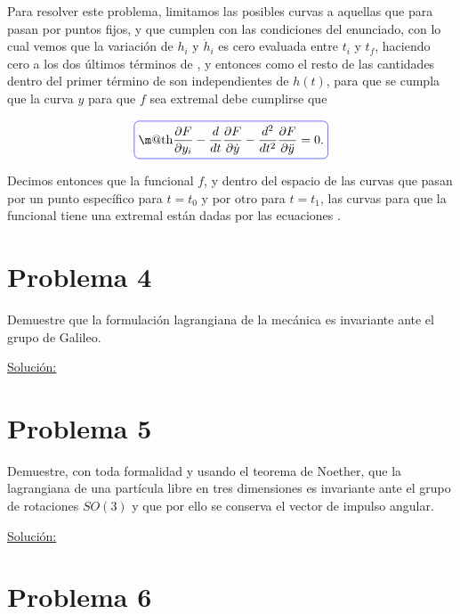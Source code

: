 \documentclass[a4paper,10pt]{article}
\makeatletter
\numberwithin{equation}{section}
\newcommand*{\boxcolor}{blue}
\renewcommand{\boxed}[1]{\textcolor{\boxcolor}{%
\tikz[baseline={([yshift=-1ex]current bounding box.center)}] \node [rectangle, minimum width=1ex,rounded corners,draw] {\normalcolor\m@th$\displaystyle#1$};}}
\makeatother
\begin{document}
Para resolver este problema, limitamos las posibles curvas a aquellas que 
para pasan por puntos fijos, y que cumplen con las condiciones del enunciado, con lo 
cual vemos que la variación de $h_i$ y $\dot{h}_i$ es cero evaluada entre $t_i$ y $t_f$, 
haciendo cero a los dos últimos términos de , y entonces 
como el resto de las cantidades dentro del primer término de 
son independientes de $h(t)$, para que se cumpla que la curva $y$ para que $f$ sea 
extremal debe cumplirse que 

\begin{equation}
\boxed{\frac{\partial F}{\partial y_i}  - 
 \frac{d}{dt}\frac{\partial F}{\partial \dot{y}}  
 - \frac{d^2}{dt^2}\frac{\partial F}{\partial \ddot{y}} = 0.}
 \label{eq:condicionExtremal}
\end{equation}

Decimos entonces que la funcional $f$, y dentro del espacio de las curvas que pasan 
por un punto específico para $t=t_0$ y por otro para $t=t_1$, las curvas para que la 
funcional tiene una extremal están dadas por las ecuaciones .



\section{Problema 4}

Demuestre que la formulación lagrangiana de la mecánica es invariante ante el grupo 
de Galileo.

\vspace{.3cm}

\underline{Solución:} \vspace{.3cm}

\section{Problema 5}

Demuestre, con toda formalidad y usando el teorema de Noether, que la lagrangiana 
de una partícula libre en tres dimensiones es invariante ante el grupo de rotaciones 
$SO(3)$ y que por ello se conserva el vector de impulso angular.

\vspace{.3cm}

\underline{Solución:} \vspace{.3cm}

\section{Problema 6}
\end{document}
